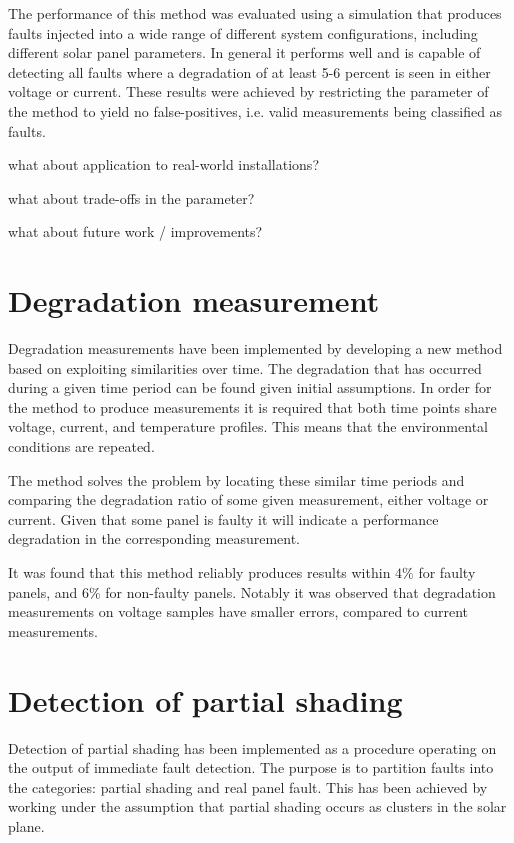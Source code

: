 The performance of this method was evaluated using a simulation that produces faults injected into a wide range of different system configurations, including different solar panel parameters.
In general it performs well and is capable of detecting all faults where a degradation of at least 5-6 percent is seen in either voltage or current.
These results were achieved by restricting the parameter of the method to yield no false-positives, i.e. valid measurements being classified as faults.

what about application to real-world installations?

what about trade-offs in the parameter?

what about future work / improvements?

\section{Degradation measurement}
Degradation measurements have been implemented by developing a new method based on exploiting similarities over time.
The degradation that has occurred during a given time period can be found given initial assumptions.
In order for the method to produce measurements it is required that both time points share voltage, current, and temperature profiles.
This means that the environmental conditions are repeated.

The method solves the problem by locating these similar time periods and comparing the degradation ratio of some given measurement, either voltage or current.
Given that some panel is faulty it will indicate a performance degradation in the corresponding measurement.

It was found that this method reliably produces results within $4\%$ for faulty panels, and $6\%$ for non-faulty panels.
Notably it was observed that degradation measurements on voltage samples have smaller errors, compared to current measurements.

\section{Detection of partial shading}
Detection of partial shading has been implemented as a procedure operating on the output of immediate fault detection.
The purpose is to partition faults into the categories: partial shading and real panel fault.
This has been achieved by working under the assumption that partial shading occurs as clusters in the solar plane.

